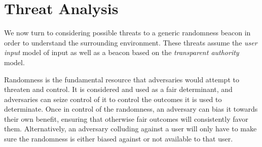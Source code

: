 \section{Threat Analysis}
We now turn to considering possible threats to a generic randomness beacon in order to understand the surrounding environment.
These threats assume the \emph{user input} model of input as well as a beacon based on the \emph{transparent authority} model.

Randomness is the fundamental resource that adversaries would attempt to threaten and control. It is considered and used as a fair determinant, and adversaries can seize control of it to control the outcomes it is used to determinate. Once in control of the randomness, an adversary can bias it towards their own benefit, ensuring that otherwise fair outcomes will consistently favor them. Alternatively, an adversary colluding against a user will only have to make sure the randomness is either biased against or not available to that user.
